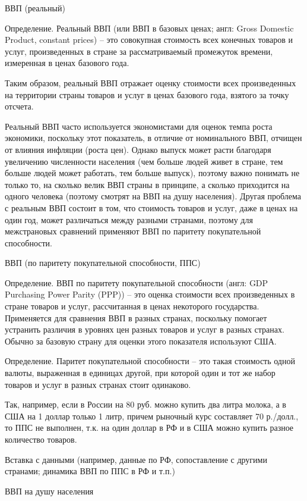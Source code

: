 \documentclass[12pt,a4paper]{article}
\begin{document}
	ВВП (реальный)

Определение. Реальный ВВП (или ВВП в базовых ценах; англ: Gross Domestic Product, constant prices) – это совокупная стоимость всех конечных товаров и услуг, произведенных в стране за рассматриваемый промежуток времени, измеренная в ценах базового года. 

Таким образом, реальный ВВП отражает оценку стоимости всех произведенных на территории страны товаров и услуг в ценах базового года, взятого за точку отсчета.

Реальный ВВП часто используется экономистами для оценок темпа роста экономики, поскольку этот показатель, в отличие от номинального ВВП, отчищен от влияния инфляции (роста цен). Однако выпуск может расти благодаря увеличению численности населения (чем больше людей живет в стране, тем больше людей может работать, тем больше выпуск), поэтому важно понимать не только то, на сколько велик ВВП страны в принципе, а сколько приходится на одного человека (поэтому смотрят на ВВП на душу населения). Другая проблема с реальным ВВП состоит в том, что стоимость товаров и услуг, даже в ценах на один год, может различаться между разными странами, поэтому для межстрановых сравнений применяют ВВП по паритету покупательной способности.

	ВВП (по паритету покупательной способности, ППС)

Определение. ВВП по паритету покупательной способности (англ: GDP Purchasing Power Parity (PPP)) – это оценка стоимости всех произведенных в стране товаров и услуг, рассчитанная в ценах некоторого государства. Применяется для сравнения ВВП в разных странах, поскольку помогает устранить различия в уровнях цен разных товаров и услуг в разных странах. Обычно за базовую страну для оценки этого показателя используют США.

Определение. Паритет покупательной способности – это такая стоимость одной валюты, выраженная в единицах другой, при которой один и тот же набор товаров и услуг в разных странах стоит одинаково.

Так, например, если в России на 80 руб. можно купить два литра молока, а в США на 1 доллар только 1 литр, причем рыночный курс составляет 70 р./долл., то ППС не выполнен, т.к. на один доллар в РФ и в США можно купить разное количество товаров.

Вставка с данными (например, данные по РФ, сопоставление с другими странами; динамика ВВП по ППС в РФ и т.п.)

	ВВП на душу населения 
\end{document}
